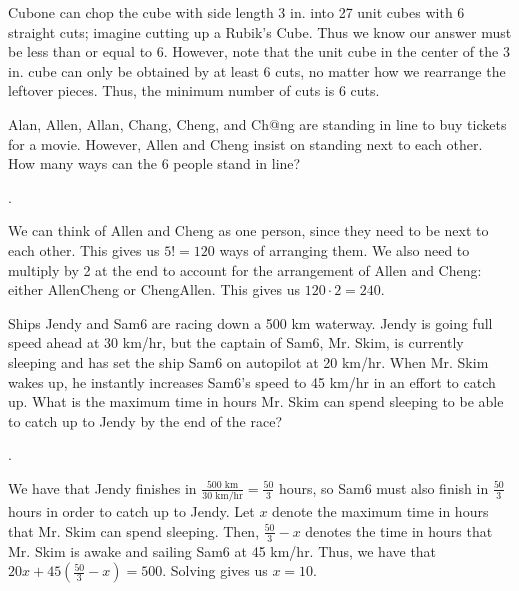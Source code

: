 \documentclass[11pt]{article}
\begin{document}
\begin{solution}
Cubone can chop the cube with side length 3 in. into 27 unit cubes with 6 straight cuts; imagine cutting up a Rubik's Cube. Thus we know our answer must be less than or equal to 6. However, note that the unit cube in the center of the 3 in. cube can only be obtained by at least 6 cuts, no matter how we rearrange the leftover pieces. Thus, the minimum number of cuts is 6 cuts.
\end{solution}

\begin{problem}
Alan, Allen, Allan, Chang, Cheng, and Ch@ng are standing in line to buy tickets for a movie. However, Allen and Cheng insist on standing next to each other. How many ways can the 6 people stand in line?
\end{problem}

\begin{answer}
.
\end{answer}

\begin{solution}
We can think of Allen and Cheng as one person, since they need to be next to each other. This gives us $5! = 120$ ways of arranging them. We also need to multiply by 2 at the end to account for the arrangement of Allen and Cheng: either AllenCheng or ChengAllen. This gives us $120\cdot2 = \boxed{240}$.
\end{solution}

\begin{problem}
Ships Jendy and Sam6 are racing down a 500 km waterway. Jendy is going full speed ahead at 30 km/hr, but the captain of Sam6, Mr. Skim, is currently sleeping and has set the ship Sam6 on autopilot at 20 km/hr. When Mr. Skim wakes up, he instantly increases Sam6's speed to 45 km/hr in an effort to catch up. What is the maximum time in hours Mr. Skim can spend sleeping to be able to catch up to Jendy by the end of the race?
\end{problem}

\begin{answer}
.
\end{answer}

\begin{solution}
We have that Jendy finishes in $\frac{500 \text{ km}}{30 \text{ km/hr}} = \frac{50}{3}$ hours, so Sam6 must also finish in $\frac{50}{3}$ hours in order to catch up to Jendy. Let $x$ denote the maximum time in hours that Mr. Skim can spend sleeping. Then, $\frac{50}{3} - x$ denotes the time in hours that Mr. Skim is awake and sailing Sam6 at 45 km/hr. Thus, we have that $20x + 45(\frac{50}{3}-x) = 500$. Solving gives us $x = \boxed{10}$.
\end{solution}
\end{document}
